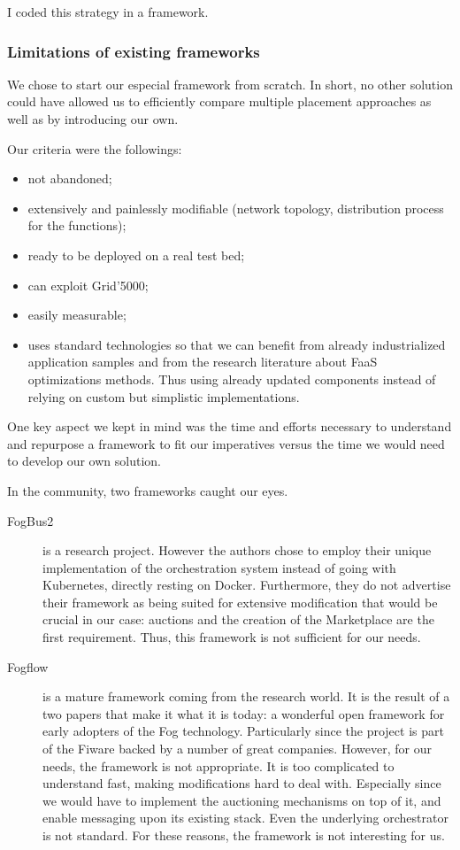 I coded this strategy in a framework.

\subsubsection{Limitations of existing frameworks}

We chose to start our especial framework from scratch. In short, no other solution could have allowed us to efficiently compare multiple placement approaches as well as by introducing our own.

Our criteria were the followings:
\begin{itemize}
	\item not abandoned;
	\item extensively and painlessly modifiable (network topology, distribution process for the functions);
	\item ready to be deployed on a real test bed;
	\item can exploit Grid'5000;
	\item easily measurable;
	\item uses standard technologies so that we can benefit from already industrialized application samples and from the research literature about \gls{FaaS} optimizations methods. Thus using already updated components instead of relying on custom but simplistic implementations.
\end{itemize}

One key aspect we kept in mind was the time and efforts necessary to understand and repurpose a framework to fit our imperatives versus the time we would need to develop our own solution.

In the community, two frameworks caught our eyes.
\begin{description}
	\item[FogBus2 \cite{deng_fogbus2_2021}]{is a research project. However the authors chose to employ their unique implementation of the orchestration system instead of going with Kubernetes, directly resting on Docker. Furthermore, they do not advertise their framework as being suited for extensive modification that would be crucial in our case: auctions and the creation of the Marketplace are the first requirement. Thus, this framework is not sufficient for our needs.
	      }
	\item[Fogflow \cite{smartfog_fogflow_2022}]{ is a mature framework coming from the research world. It is the result of a two papers \cite{cheng_fogflow_2018, cheng_fog_2019} that make it what it is today: a wonderful open framework for early adopters of the Fog technology. Particularly since the project is part of the Fiware \cite{fiware_foundation_fiware_2021} backed by a number of great companies. However, for our needs, the framework is not appropriate. It is too complicated to understand fast, making modifications hard to deal with. Especially since we would have to implement the auctioning mechanisms on top of it, and enable messaging upon its existing stack. Even the underlying orchestrator is not standard. For these reasons, the framework is not interesting for us.}
\end{description}

